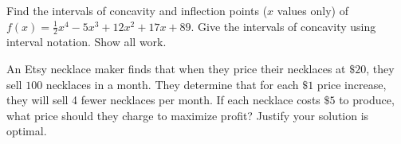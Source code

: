 \documentclass[addpoints,12pt]{exam}
\begin{document}
\begin{questions}
\begin{figure}[h]
\begin{center}
\begin{tikzpicture}
                     
                     \end{tikzpicture}
              \end{center}
       \end{figure}

\newpage

\question[10] Find the intervals of concavity and inflection points ($x$ values only) of
$f(x)=\frac{1}{2}{x}^{4}-5{x}^{3}+12{x}^{2}+17x+89$. Give the intervals of concavity using
interval notation. Show all work.


\newpage




\question[12] An Etsy necklace maker finds that when they price their necklaces at $\$20 $, they
sell $100$ necklaces in a month. They determine that for each $\$1 $ price increase, they will
sell 4 fewer necklaces per month. If each necklace costs $\$5$ to produce, what price should
they charge to maximize profit? Justify your solution is optimal.

\newpage




\question


\end{questions}
\end{document}
